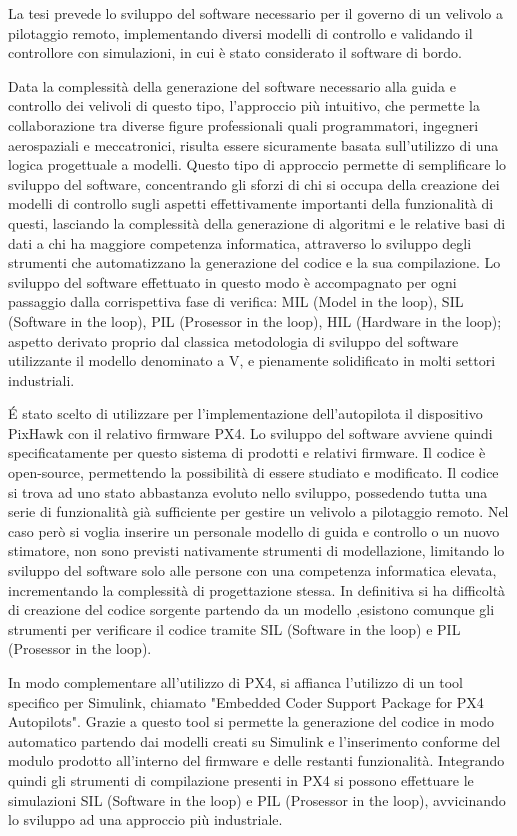 \sommario
La tesi prevede lo sviluppo del software necessario per il governo di un velivolo a pilotaggio remoto, implementando diversi modelli di controllo e validando il controllore con simulazioni, in cui è stato considerato il software di bordo.

Data la complessità della generazione del software necessario alla guida e controllo dei velivoli di questo tipo, l'approccio più intuitivo, che permette la collaborazione tra diverse figure professionali quali programmatori, ingegneri aerospaziali e meccatronici, risulta essere sicuramente basata sull'utilizzo di una logica progettuale a modelli. Questo tipo di approccio permette di semplificare lo sviluppo del software, concentrando gli sforzi di chi si occupa della creazione dei modelli di controllo sugli aspetti effettivamente importanti della funzionalità di questi, lasciando la complessità della generazione di algoritmi e le relative basi di dati a chi ha maggiore competenza informatica, attraverso lo sviluppo degli strumenti che automatizzano la generazione del codice e la sua compilazione. 
Lo sviluppo del software effettuato in questo modo è accompagnato per ogni passaggio dalla corrispettiva fase di verifica: MIL (Model in the loop), SIL (Software in the loop), PIL (Prosessor in the loop), HIL (Hardware in the loop); aspetto derivato proprio dal classica metodologia di sviluppo del software utilizzante il modello denominato a V, e pienamente solidificato in molti settori industriali.

\'E stato scelto di utilizzare per l'implementazione dell'autopilota il dispositivo PixHawk con il relativo firmware PX4. Lo sviluppo del software avviene quindi specificatamente per questo sistema di prodotti e relativi firmware. Il codice è open-source, permettendo la possibilità di essere studiato e modificato. Il codice si trova ad uno stato abbastanza evoluto nello sviluppo, possedendo tutta una serie di funzionalità già sufficiente per gestire un velivolo a pilotaggio remoto. Nel caso però si voglia inserire un personale modello di guida e controllo o un nuovo stimatore, non sono previsti nativamente strumenti di modellazione, limitando lo sviluppo del software solo alle persone con una competenza informatica elevata, incrementando la complessità di progettazione stessa. In definitiva si ha difficoltà di creazione del codice sorgente partendo da un modello ,esistono comunque gli strumenti per verificare il codice tramite SIL (Software in the loop) e PIL (Prosessor in the loop).

In modo complementare all'utilizzo di PX4, si affianca l'utilizzo di un tool specifico per Simulink, chiamato "Embedded Coder Support Package
for PX4 Autopilots". Grazie a questo tool si permette la generazione del codice in modo automatico partendo dai modelli creati su Simulink e l'inserimento conforme del modulo prodotto all'interno del firmware e delle restanti funzionalità. Integrando quindi gli strumenti di compilazione presenti in PX4 si possono effettuare le simulazioni SIL (Software in the loop) e PIL (Prosessor in the loop), avvicinando lo sviluppo ad una approccio più industriale.

